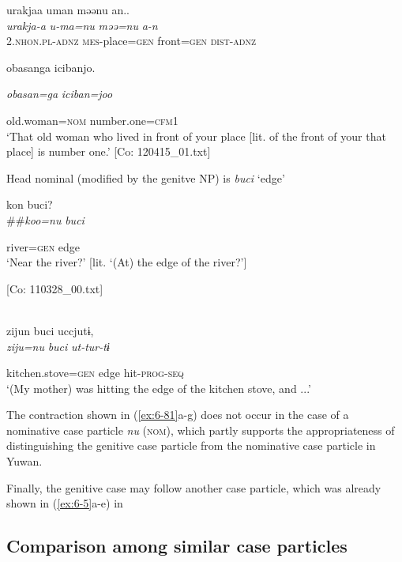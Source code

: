 \begin{table}
\ex {\TM}  urakjaa  uman  məənu  an..\\
\glll \textit{urakja-a}  \textit{u-ma=nu}  \textit{məə=nu}  \textit{a-n}\\
2.\textsc{nhon}.\textsc{pl}-\textsc{adnz}  \textsc{mes}-place=\textsc{gen}  front=\textsc{gen}  \textsc{dist}-\textsc{adnz}

      {\textbar}obasan{\textbar}ga  {\textbar}iciban{\textbar}jo.

      \textit{obasan=ga}  \textit{iciban=joo}

      old.woman=\textsc{nom}  number.one=\textsc{cfm}1\\
\glt ‘That old woman who lived in front of your place [lit. of the front of your that place] is number one.’ [Co: 120415\_01.txt]
\z

  Head nominal (modified by the genitve NP) is \textit{buci} ‘edge’

\ex  {\TM}  kon  buci?\\##\textit{koo=nu}  \textit{buci}

      river=\textsc{gen}  edge\\
\glt ‘Near the river?’ [lit. ‘(At) the edge of the river?’]

      [Co: 110328\_00.txt]
\z

\\

{\TM}
\glll zijun  buci  uccjutɨ,\\

      \textit{ziju=nu}  \textit{buci}  \textit{ut-tur-tɨ}

      kitchen.stove=\textsc{gen}  edge  hit-\textsc{prog}-\textsc{seq}\\
\glt ‘(My mother) was hitting the edge of the kitchen stove, and ...’

The contraction shown in (\ref{ex:6-81}a-g) does not occur in the case of a nominative case particle \textit{nu} (\textsc{nom}), which partly supports the appropriateness of distinguishing the genitive case particle from the nominative case particle in Yuwan.

  Finally, the genitive case may follow another case particle, which was already shown in (\ref{ex:6-5}a-e) in 

\subsection{Comparison among similar case particles}


\end{table}
